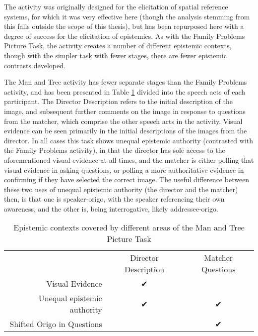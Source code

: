 The activity was originally designed for the elicitation of spatial reference systems, for which it was very effective here (though the analysis stemming from this falls outside the scope of this thesis), but has been repurposed here with a degree of success for the elicitation of epistemics. As with the Family Problems Picture Task, the activity creates a number of different epistemic contexts, though with the simpler task with fewer stages, there are fewer epistemic contrasts developed.

The Man and Tree activity has fewer separate stages than the Family Problems activity, and has been presented in Table \ref{t:Methods:ManTreeEvidentials} divided into the speech acts of each participant. The Director Description refers to the initial description of the image, and subsequent further comments on the image in response to questions from the matcher, which comprise the other speech acts in the activity. Visual evidence can be seen primarily in the initial descriptions of the images from the director. In all cases this task shows unequal epistemic authority (contrasted with the Family Problems activity), in that the director has sole access to the aforementioned visual evidence at all times, and the matcher is either polling that visual evidence in asking questions, or polling a more authoritative evidence in confirming if they have selected the correct image. The useful difference between these two uses of unequal epistemic authority (the director and the matcher) then, is that one is speaker-origo, with the speaker referencing their own awareness, and the other is, being interrogative, likely addressee-origo.

\begin{table}
       \caption{Epistemic contexts covered by different areas of the Man and Tree Picture Task}\label{t:Methods:ManTreeEvidentials}
       \begin{tabular}{r|c|c}
                                          & Director Description & Matcher Questions \\
              Visual Evidence             & ✔                    &                   \\
              Unequal epistemic authority & ✔                    & ✔                 \\
              Shifted Origo in Questions  &                      & ✔
       \end{tabular}
       
\end{table}

